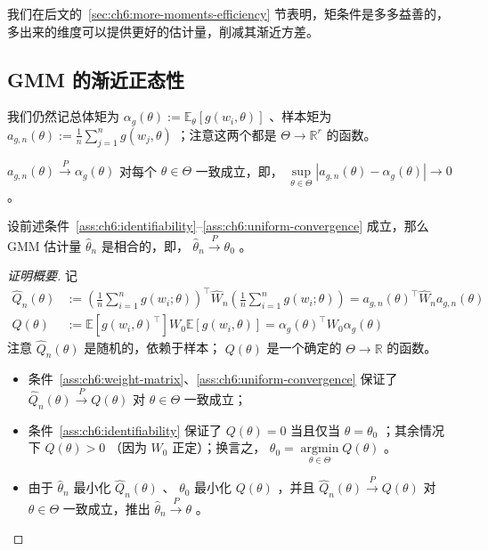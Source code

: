 \begin{remark}
我们在后文的~\ref{sec:ch6:more-moments-efficiency} 节表明，矩条件是多多益善的，多出来的维度可以提供更好的估计量，削减其渐近方差。

\subsection{GMM 的渐近正态性}

我们仍然记总体矩为 $\alpha_g(\theta):=\mathbb{E}_\theta[g(w_i,\theta)]$ 、样本矩为 $a_{g,n}(\theta):=\frac1n\sum_{j=1}^ng(w_j,\theta)$ ；注意这两个都是 $\Theta\to \mathbb R^r$ 的函数。%

\begin{assumption}[一致收敛]\label{ass:ch6:uniform-convergence}

$a_{g,n}(\theta)\overset{P}\to \alpha_g(\theta)$ 对每个 $\theta\in\Theta$ 一致成立，即， $\sup\limits_{\theta\in\Theta}|a_{g,n}(\theta)-\alpha_g(\theta)|\to 0$ 。

\end{assumption}

\begin{theorem}
\label{thm:ch6:gmm-consistency}

设前述条件~\ref{ass:ch6:identifiability}--\ref{ass:ch6:uniform-convergence} 成立，那么 GMM 估计量 $\widehat\theta_n$ 是相合的，即， $\widehat\theta_n\overset P\to\theta_0$ 。

\end{theorem}

\begin{proof}[证明概要]
记
\[\begin{aligned} \widehat Q_n(\theta)&:=\left( \frac1n\sum_{i=1}^n g(w_i;\theta) \right)^\top \widehat{W}_n \left( \frac{1}{n}\sum_{i=1}^n g(w_i;\theta) \right)=a_{g,n}(\theta)^\top \widehat W_na_{g,n}(\theta)\\ Q(\theta)&:=\mathbb{E}[g(w_i,\theta)^\top]W_0\mathbb{E}[g(w_i,\theta)]=\alpha_g(\theta)^\top W_0\alpha_g(\theta) \end{aligned}\]
注意 $\widehat Q_n(\theta)$ 是随机的，依赖于样本； $Q(\theta)$ 是一个确定的 $\Theta\to \mathbb R$ 的函数。

\begin{itemize}
\tightlist
\item
  条件~\ref{ass:ch6:weight-matrix}、\ref{ass:ch6:uniform-convergence} 保证了 $\widehat Q_n(\theta)\overset{P}\to Q(\theta)$ 对 $\theta\in\Theta$ 一致成立；
\item
  条件~\ref{ass:ch6:identifiability} 保证了 $Q(\theta)=0$ 当且仅当 $\theta=\theta_0$ ；其余情况下 $Q(\theta)>0$ （因为 $W_0$ 正定）；换言之， $\theta_0=\operatorname*{\arg\min}\limits_{\theta\in\Theta}Q(\theta)$ 。
\item
  由于 $\widehat\theta_n$ 最小化 $\widehat Q_n(\theta)$ 、 $\theta_0$ 最小化 $Q(\theta)$ ，并且 $\widehat Q_n(\theta)\overset{P}\to Q(\theta)$ 对 $\theta\in\Theta$ 一致成立，推出 $\widehat\theta_n\overset{P}\to\theta$ 。
\end{itemize}


\end{proof}
\end{remark}
